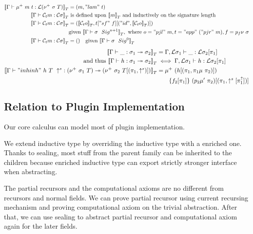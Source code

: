 \begin{align*}
  {{\llbracket {{ {\Gamma} \vdash {\mu^+~m~t} : {{\mathcal{L}}(\nu^+~\sigma~T)} }} \rrbracket}_T} &= (m, "lam"~t) \\ 
  {{\llbracket {{ {\Gamma} \vdash {{\mathcal{C}_t}m} : {{\mathcal{C}}\sigma} }} \rrbracket}_T} & \text{ is defined upon } {{\llbracket {m} \rrbracket}_T} \text{ and inductively on the signature length} \\ 
  {{\llbracket {{ {\Gamma} \vdash {{\mathcal{C}_t}m} : {{\mathcal{C}}\sigma} }} \rrbracket}_T} &= 
  ({{\llbracket {{\mathcal{C}_t}o} \rrbracket}_T}, t["sf"~f][("id", {{\llbracket {{\mathcal{C}_t}o} \rrbracket}_T})]) \\
  & \text{given } {{\llbracket {{ {\Gamma} \vdash {\sigma} \ \ Sig^{n+1} }} \rrbracket}_T}, \text{ where } o = "pjl"~m, t = "app"~("pjr"~m), f = p_f\nu~\sigma \\ 
  {{\llbracket {{ {\Gamma} \vdash {{\mathcal{C}_t}m} : {{\mathcal{C}}\sigma} }} \rrbracket}_T} &= () \quad \text{given } {{\llbracket {{ {\Gamma} \vdash {\sigma} \ \ Sig^{0} }} \rrbracket}_T}
\end{align*}
\begin{align*}
  {{\llbracket {{ {\Gamma} \vdash {\_} : {\sigma_1} \twoheadrightarrow {\sigma_2}}} \rrbracket}_T} &= { {\Gamma, {\mathcal{L}}\sigma_1} \vdash {\_} : {{\mathcal{L}}\sigma_2[\pi_1]} } \\ \text{ and thus } {{\llbracket {{ {\Gamma} \vdash {h} : {\sigma_1} \twoheadrightarrow {\sigma_2}}} \rrbracket}_T} &\iff  { {\Gamma, {\mathcal{L}}\sigma_1} \vdash {h} : {{\mathcal{L}}\sigma_2[\pi_1]} } \\
  {{\llbracket {{ {\Gamma} \vdash {"inhinh"~h~T~\uparrow^s} : {(\nu^+ \  \sigma_1 \  T)} \twoheadrightarrow {(\nu^+ \  \sigma_2 \  T[(\pi_1, \uparrow^s)])}}} \rrbracket}_T} &= \mu^+~(h[(\pi_1,\pi_1\mu~\pi_2)])\\ &\quad \quad \{f_2[\pi_1]\}~(p_2\mu'~\pi_2)[(\pi_1, \uparrow^s[\pi_1^{\uparrow}])] \\
\end{align*}




\subsection{Relation to Plugin Implementation}
Our core calculus can model most of plugin implementation. 

We extend inductive type by overriding the inductive type with a enriched one. Thanks to sealing, most stuff from the parent family can be inherited to the children because enriched inductive type can export strictly stronger interface when abstracting.

The partial recursors and the computational axioms are no different from recursors and normal fields. We can prove partial recursor using current recursing mechanism and proving computational axiom on the trivial abstraction. After that, we can use sealing to abstract partial recursor and computational axiom again for the later fields.

